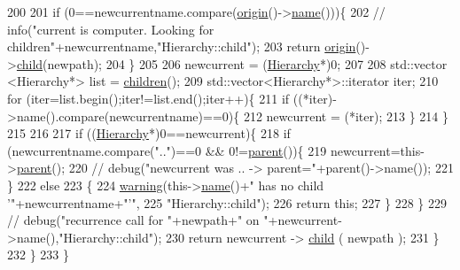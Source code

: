 \begin{DoxyCode}
200 
201       \textcolor{keywordflow}{if} (0==newcurrentname.compare(\hyperlink{classHierarchy_aee461dc930ce3871636ff87f075b1b83}{origin}()->\hyperlink{classObject_a300f4c05dd468c7bb8b3c968868443c1}{name}()))\{
202         \textcolor{comment}{//        info("current is computer. Looking for children"+newcurrentname,"Hierarchy::child");}
203         \textcolor{keywordflow}{return} \hyperlink{classHierarchy_aee461dc930ce3871636ff87f075b1b83}{origin}()->\hyperlink{classHierarchy_a1e207f973c694b538bf90107b4868817}{child}(newpath);
204       \}
205 
206       newcurrent = (\hyperlink{classHierarchy}{Hierarchy}*)0;
207 
208       std::vector <Hierarchy*> list = \hyperlink{classHierarchy_aa9a76f69e98e052ee1a6e32cea006288}{children}();
209       std::vector<Hierarchy*>::iterator iter;
210       \textcolor{keywordflow}{for} (iter=list.begin();iter!=list.end();iter++)\{
211         \textcolor{keywordflow}{if} ((*iter)->name().compare(newcurrentname)==0)\{
212           newcurrent = (*iter);
213         \}
214       \}
215 
216 
217       \textcolor{keywordflow}{if} ((\hyperlink{classHierarchy}{Hierarchy}*)0==newcurrent)\{
218         \textcolor{keywordflow}{if} (newcurrentname.compare(\textcolor{stringliteral}{".."})==0 && 0!=\hyperlink{classHierarchy_a1c7bec8257e717f9c1465e06ebf845fc}{parent}())\{
219           newcurrent=this->\hyperlink{classHierarchy_a1c7bec8257e717f9c1465e06ebf845fc}{parent}();
220           \textcolor{comment}{//          debug("newcurrent was .. -> parent="+parent()->name());}
221         \}
222         \textcolor{keywordflow}{else}
223         \{
224           \hyperlink{classObject_a65cd4fda577711660821fd2cd5a3b4c9}{warning}(this->\hyperlink{classObject_a300f4c05dd468c7bb8b3c968868443c1}{name}()+\textcolor{stringliteral}{" has no child '"}+newcurrentname+\textcolor{stringliteral}{"'"},
225               \textcolor{stringliteral}{"Hierarchy::child"});
226           \textcolor{keywordflow}{return} \textcolor{keyword}{this};
227         \}
228       \}
229       \textcolor{comment}{//      debug("recurrence call for "+newpath+" on "+newcurrent->name(),"Hierarchy::child");}
230       \textcolor{keywordflow}{return} newcurrent -> \hyperlink{classHierarchy_a1e207f973c694b538bf90107b4868817}{child} ( newpath );
231     \}
232   \}
233 \}
\end{DoxyCode}
\mbox{\label{classHierarchy_aa9a76f69e98e052ee1a6e32cea006288}} 
